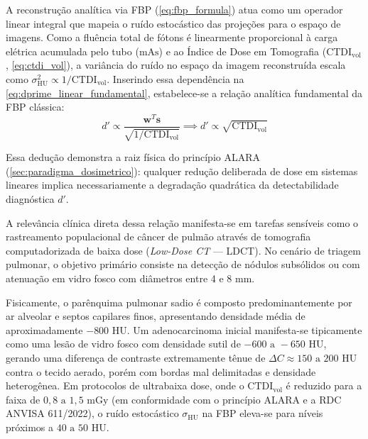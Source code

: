 \documentclass[
  12pt,
  a4paper,
  oneside
]{report}
\begin{document}
A reconstrução analítica via FBP (\cref{eq:fbp_formula}) atua como um operador linear integral que mapeia o ruído estocástico das projeções para o espaço de imagens. Como a fluência total de fótons é linearmente proporcional à carga elétrica acumulada pelo tubo ($\text{mAs}$) e ao Índice de Dose em Tomografia ($\text{CTDI}_{\text{vol}}$, \cref{eq:ctdi_vol}), a variância do ruído no espaço da imagem reconstruída escala como $\sigma_{\text{HU}}^2 \propto 1 / \text{CTDI}_{\text{vol}}$. Inserindo essa dependência na \cref{eq:dprime_linear_fundamental}, estabelece-se a relação analítica fundamental da FBP clássica:
\begin{equation}
  d' \propto \frac{\mathbf{w}^T \mathbf{s}}{\sqrt{1 / \text{CTDI}_{\text{vol}}}} \implies d' \propto \sqrt{\text{CTDI}_{\text{vol}}}
  \label{eq:escalonamento_dprime_dose}
\end{equation}

Essa dedução demonstra a raiz física do princípio ALARA (\cref{sec:paradigma_dosimetrico}): qualquer redução deliberada de dose em sistemas lineares implica necessariamente a degradação quadrática da detectabilidade diagnóstica $d'$.

A relevância clínica direta dessa relação manifesta-se em tarefas sensíveis como o rastreamento populacional de câncer de pulmão através de tomografia computadorizada de baixa dose (\emph{Low-Dose CT} --- LDCT). No cenário de triagem pulmonar, o objetivo primário consiste na detecção de nódulos subsólidos ou com atenuação em vidro fosco com diâmetros entre 4 e 8 mm.

Fisicamente, o parênquima pulmonar sadio é composto predominantemente por ar alveolar e septos capilares finos, apresentando densidade média de aproximadamente $-800\text{ HU}$. Um adenocarcinoma inicial manifesta-se tipicamente como uma lesão de vidro fosco com densidade sutil de $-600\text{ a } -650\text{ HU}$, gerando uma diferença de contraste extremamente tênue de $\Delta C \approx 150\text{ a } 200\text{ HU}$ contra o tecido aerado, porém com bordas mal delimitadas e densidade heterogênea. Em protocolos de ultrabaixa dose, onde o $\text{CTDI}_{\text{vol}}$ é reduzido para a faixa de $0{,}8\text{ a } 1{,}5\text{ mGy}$ (em conformidade com o princípio ALARA e a RDC ANVISA 611/2022), o ruído estocástico $\sigma_{\text{HU}}$ na FBP eleva-se para níveis próximos a $40\text{ a } 50\text{ HU}$.
\end{document}
